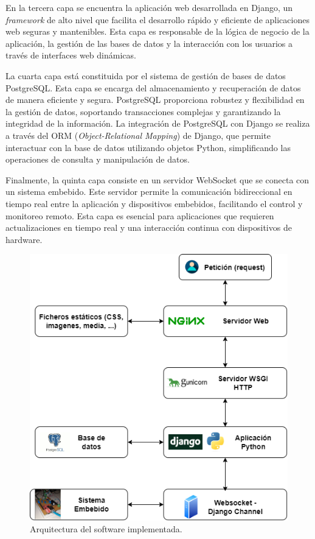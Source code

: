 En la tercera capa se encuentra la aplicación web desarrollada en Django, un \textit{framework} de alto nivel que facilita el desarrollo rápido y eficiente de aplicaciones web seguras y mantenibles.  Esta capa es responsable de la lógica de negocio de la aplicación, la gestión de las bases de datos y la interacción con los usuarios a través de interfaces web dinámicas.

La cuarta capa está constituida por el sistema de gestión de bases de datos PostgreSQL. Esta capa se encarga del almacenamiento y recuperación de datos de manera eficiente y segura. PostgreSQL proporciona robustez y flexibilidad en la gestión de datos, soportando transacciones complejas y garantizando la integridad de la información. La integración de PostgreSQL con Django se realiza a través del ORM (\textit{Object-Relational Mapping}) de Django, que permite interactuar con la base de datos utilizando objetos Python, simplificando las operaciones de consulta y manipulación de datos.

Finalmente, la quinta capa consiste en un servidor WebSocket que se conecta con un sistema embebido. Este servidor permite la comunicación bidireccional en tiempo real entre la aplicación y dispositivos embebidos, facilitando el control y monitoreo remoto. Esta capa es esencial para aplicaciones que requieren actualizaciones en tiempo real y una interacción continua con dispositivos de hardware.

\begin{figure}[H]
    \centering
    \includegraphics[width=0.7\linewidth]{Figuras/AplicacionWeb/arquitecturaSoft.png}
    \caption{Arquitectura del software implementada.}
    \label{fig:arquitecturaSoft}
\end{figure}

